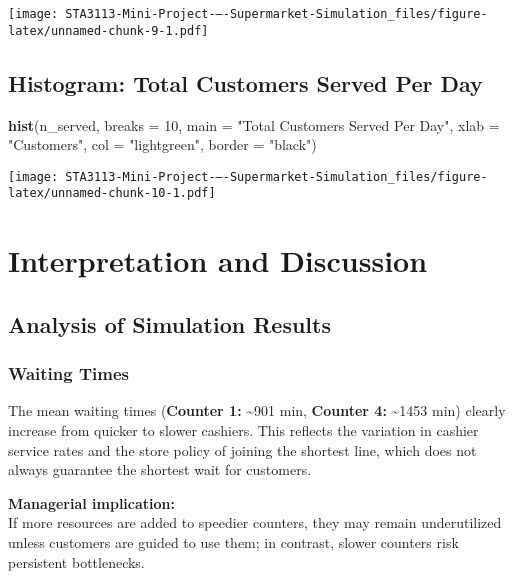 \documentclass[
]{article}
\newenvironment{Shaded}{\begin{snugshade}}{\end{snugshade}}
\newcommand{\AttributeTok}[1]{\textcolor[rgb]{0.13,0.29,0.53}{#1}}
\newcommand{\DecValTok}[1]{\textcolor[rgb]{0.00,0.00,0.81}{#1}}
\newcommand{\FunctionTok}[1]{\textcolor[rgb]{0.13,0.29,0.53}{\textbf{#1}}}
\newcommand{\NormalTok}[1]{#1}
\newcommand{\StringTok}[1]{\textcolor[rgb]{0.31,0.60,0.02}{#1}}
\begin{document}
\texttt{[image: STA3113-Mini-Project-–-Supermarket-Simulation\_files/figure-latex/unnamed-chunk-9-1.pdf]}

\newpage
\justifying

\subsection{Histogram: Total Customers Served Per
Day}\label{histogram-total-customers-served-per-day}

\begin{Shaded}
\begin{Highlighting}[]
\FunctionTok{hist}\NormalTok{(n\_served,}
\AttributeTok{breaks =} \DecValTok{10}\NormalTok{,}
\AttributeTok{main =} \StringTok{"Total Customers Served Per Day"}\NormalTok{,}
\AttributeTok{xlab =} \StringTok{"Customers"}\NormalTok{,}
\AttributeTok{col =} \StringTok{"lightgreen"}\NormalTok{,}
\AttributeTok{border =} \StringTok{"black"}\NormalTok{)}
\end{Highlighting}
\end{Shaded}

\texttt{[image: STA3113-Mini-Project-–-Supermarket-Simulation\_files/figure-latex/unnamed-chunk-10-1.pdf]}

\newpage
\centering

\section{Interpretation and
Discussion}\label{interpretation-and-discussion}

\justifying

\subsection{Analysis of Simulation
Results}\label{analysis-of-simulation-results}

\subsubsection{Waiting Times}\label{waiting-times}

The mean waiting times (\textbf{Counter 1:} \textasciitilde901 min,
\textbf{Counter 4:} \textasciitilde1453 min) clearly increase from
quicker to slower cashiers. This reflects the variation in cashier
service rates and the store policy of joining the shortest line, which
does not always guarantee the shortest wait for customers.

\textbf{Managerial implication:}\\
If more resources are added to speedier counters, they may remain
underutilized unless customers are guided to use them; in contrast,
slower counters risk persistent bottlenecks.
\end{document}
